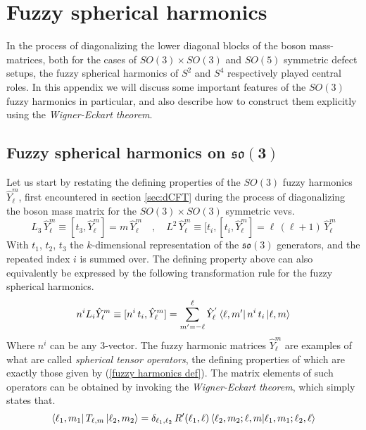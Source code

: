 %
\section{Fuzzy spherical harmonics}\label{sec:fuzzy spherical harmonics}
In the process of diagonalizing the lower diagonal blocks of the boson mass-matrices, both for the cases of $SO(3) \times SO(3)$ and $SO(5)$ symmetric defect setups, the fuzzy spherical harmonics of $S^2$ and $S^4$ respectively played central roles. In this appendix we will discuss some important features of the $SO(3)$ fuzzy harmonics in particular, and also describe how to construct them explicitly using the \textit{Wigner-Eckart theorem}.

\subsection[Fuzzy spherical harmonics on $\mathfrak{so}(3)$]{Fuzzy spherical harmonics on $\mathbf{\mathfrak{so}(3)}$}
Let us start by restating the defining properties of the $SO(3)$ fuzzy harmonics $\hat{Y}^m_\ell$, first encountered in section \ref{sec:dCFT} during the process of diagonalizing the boson mass matrix for the $SO(3) \times SO(3)$ symmetric vevs.  
%
%
\begin{equation}
L_3 \, \hat{Y}^m_\ell \equiv [t_3, \hat{Y}^m_\ell] = m \, \hat{Y}^m_\ell
%
\quad , \quad
%
L^2 \, \hat{Y}^m_\ell \equiv [t_i, [t_i, \hat{Y}^m_\ell] = \ell \, (\ell+1) \, \hat{Y}^m_\ell
\end{equation}
%
%
With $t_1$, $t_2$, $t_3$ the $k$-dimensional representation of the $\mathfrak{so}(3)$ generators, and the repeated index $i$ is summed over. The defining property above can also equivalently be expressed by the following transformation rule for the fuzzy spherical harmonics.
%
%
\begin{equation}\label{fuzzy harmonics def}
n^i L_i \hat{Y}^m_\ell \equiv [n^i \, t_i, \hat{Y}^m_\ell]
=
\sum_{m' = -\ell}^{\ell} \hat{Y}^{'}_\ell \bra{\ell, m'} n^i \, t_i \ket{\ell, m}
\end{equation}
%
%
Where $n^i$ can be any $3$-vector. The fuzzy harmonic matrices $\hat{Y}^m_\ell$ are examples of what are called \textit{spherical tensor operators}, the defining properties of which are exactly those given by (\ref{fuzzy harmonics def}). The matrix elements of such operators can be obtained by invoking the \textit{Wigner-Eckart theorem}, which simply states that.
%
%
\begin{equation}\label{Wigner-Eckart theorem so(3)}
\bra{\ell_1, m_1} T_{\ell,m} \ket{\ell_2,m_2}
=
\delta_{\ell_1,\ell_2} \,
R'(\ell_1,\ell)
\braket{\ell_2, m_2; \ell, m}{\ell_1, m_1; \ell_2, \ell}
\end{equation}
